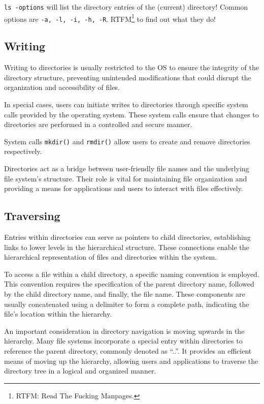 \documentclass{report}
\newcommand{\exampleBegin}[1]{\begin{tcolorbox}[colback=blue!5!white,colframe=black!75!blue,title={Example:
      #1}]}
\newcommand{\exampleEnd}{\end{tcolorbox}}
\begin{document}
\exampleBegin{Show Me What You Got}
\texttt{ls -options} will list the directory entries of the (current) directory! Common options are
\texttt{-a, -l, -i, -h, -R}. RTFM\footnote{RTFM: Read The Fucking Manpages.} to find out what they do!
\exampleEnd

\subsection{Writing}
Writing to directories is usually restricted to the OS to ensure the integrity of the directory
structure, preventing unintended modifications that could disrupt the organization and accessibility
of files.

In special cases, users can initiate writes to directories through specific system calls
provided by the operating system. These system calls ensure that changes to directories are
performed in a controlled and secure manner.

\exampleBegin{Make What?}
System calls \texttt{mkdir()} and \texttt{rmdir()} allow users to create and remove directories
respectively. 
\exampleEnd

Directories act as a bridge between user-friendly file names and the underlying file
system's structure. Their role is vital for maintaining file organization and providing a means for
applications and users to interact with files effectively.


\subsection{Traversing}
Entries within directories can serve as pointers to child directories, establishing links to lower
levels in the hierarchical structure. These connections enable the hierarchical representation of
files and directories within the system.

To access a file within a child directory, a specific naming convention is employed. This convention
requires the specification of the parent directory name, followed by the child directory name, and
finally, the file name. These components are usually concatenated using a delimiter to form a
complete path, indicating the file's location within the hierarchy.

An important consideration in directory navigation is moving upwards in the hierarchy. Many file
systems incorporate a special entry within directories to reference the parent directory, commonly
denoted as ``..''. It provides an efficient means of moving up the hierarchy, allowing users and
applications to traverse the directory tree in a logical and organized manner.
\end{document}
